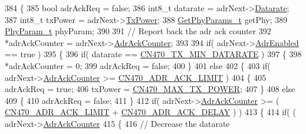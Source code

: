 \begin{DoxyCode}
384 \{
385     \textcolor{keywordtype}{bool} adrAckReq = \textcolor{keyword}{false};
386     int8\_t datarate = adrNext->\mbox{\hyperlink{structs_adr_next_params_ae2f6080f3aa0e9485c55513ca56bb24d}{Datarate}};
387     int8\_t txPower = adrNext->\mbox{\hyperlink{structs_adr_next_params_a037b4f849fa8ed4aa1d3c58aef2b28ec}{TxPower}};
388     \mbox{\hyperlink{structs_get_phy_params}{GetPhyParams\_t}} getPhy;
389     \mbox{\hyperlink{unionu_phy_param}{PhyParam\_t}} phyParam;
390 
391     \textcolor{comment}{// Report back the adr ack counter}
392     *adrAckCounter = adrNext->\mbox{\hyperlink{structs_adr_next_params_a24f0356a3491bf07be9ac99ffa33896a}{AdrAckCounter}};
393 
394     \textcolor{keywordflow}{if}( adrNext->\mbox{\hyperlink{structs_adr_next_params_ab3e2fb44577c95786e11aacd56769703}{AdrEnabled}} == \textcolor{keyword}{true} )
395     \{
396         \textcolor{keywordflow}{if}( datarate == \mbox{\hyperlink{group___r_e_g_i_o_n_c_n470_gafc089f5bdc4ad69267f562d1fda11f79}{CN470\_TX\_MIN\_DATARATE}} )
397         \{
398             *adrAckCounter = 0;
399             adrAckReq = \textcolor{keyword}{false};
400         \}
401         \textcolor{keywordflow}{else}
402         \{
403             \textcolor{keywordflow}{if}( adrNext->\mbox{\hyperlink{structs_adr_next_params_a24f0356a3491bf07be9ac99ffa33896a}{AdrAckCounter}} >= \mbox{\hyperlink{group___r_e_g_i_o_n_c_n470_gab622e938b7f31be68bbab0569252cc16}{CN470\_ADR\_ACK\_LIMIT}} )
404             \{
405                 adrAckReq = \textcolor{keyword}{true};
406                 txPower = \mbox{\hyperlink{group___r_e_g_i_o_n_c_n470_gae977eb62cc9b2f49770b5f0d5ec1e5df}{CN470\_MAX\_TX\_POWER}};
407             \}
408             \textcolor{keywordflow}{else}
409             \{
410                 adrAckReq = \textcolor{keyword}{false};
411             \}
412             \textcolor{keywordflow}{if}( adrNext->\mbox{\hyperlink{structs_adr_next_params_a24f0356a3491bf07be9ac99ffa33896a}{AdrAckCounter}} >= ( \mbox{\hyperlink{group___r_e_g_i_o_n_c_n470_gab622e938b7f31be68bbab0569252cc16}{CN470\_ADR\_ACK\_LIMIT}} + 
      \mbox{\hyperlink{group___r_e_g_i_o_n_c_n470_ga36e45d676fbedb022706448bfb3ae1ed}{CN470\_ADR\_ACK\_DELAY}} ) )
413             \{
414                 \textcolor{keywordflow}{if}( ( adrNext->\mbox{\hyperlink{structs_adr_next_params_a24f0356a3491bf07be9ac99ffa33896a}{AdrAckCounter}} %
415                 \{
416                     \textcolor{comment}{// Decrease the datarate}

\end{DoxyCode}

